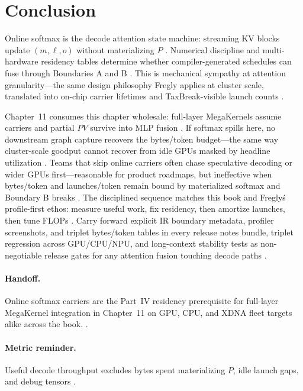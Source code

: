 \section{Conclusion}
\label{sec:ch10_conclusion}

Online softmax is the decode attention state machine: streaming KV blocks update $(m,\ell,o)$ without materializing $P$ \citep{dao2022flashattention,dao2023flashdecoding}. Numerical discipline and multi-hardware residency tables determine whether compiler-generated schedules can fuse through Boundaries A and B \citep{amd2024aie,yirage2026,semianalysis2024tma}. This is mechanical sympathy at attention granularity---the same design philosophy Fregly applies at cluster scale, translated into on-chip carrier lifetimes and TaxBreak-visible launch counts \citep{taxbreak2026,patel2025llminference,liu2024deepseekv3}.

Chapter~11 consumes this chapter wholesale: full-layer MegaKernels assume carriers and partial $PV$ survive into MLP fusion \citep{taxbreak2026,yirage2026}. If softmax spills here, no downstream graph capture recovers the bytes/token budget---the same way cluster-scale goodput cannot recover from idle GPUs masked by headline utilization \citep{memoryfloor2026,nvidia2024cudagraphs}. Teams that skip online carriers often chase speculative decoding or wider GPUs first---reasonable for product roadmaps, but ineffective when bytes/token and launches/token remain bound by materialized softmax and Boundary B breaks \citep{patel2025llminference,taxbreak2026,memoryfloor2026}. The disciplined sequence matches this book and Fregly\'s profile-first ethos: measure useful work, fix residency, then amortize launches, then tune FLOPs \citep{dao2022flashattention,semianalysis2024tma,dlbook}. Carry forward explicit IR boundary metadata, profiler screenshots, and triplet bytes/token tables in every release notes bundle, triplet regression across GPU/CPU/NPU, and long-context stability tests as non-negotiable release gates for any attention fusion touching decode paths \citep{chen2020compilerbasedhardw,kwon2023vllm}.

\paragraph{Handoff.} Online softmax carriers are the Part~IV residency prerequisite for full-layer MegaKernel integration in Chapter~11 on GPU, CPU, and XDNA fleet targets alike across the book. \citep{taxbreak2026,yirage2026,dao2022flashattention,memoryfloor2026,patel2025llminference,chen2020compilerbasedhardw,semianalysis2024tma,amd2024aie,dlbook,kwon2023vllm,nvidia2024cudagraphs,liu2024deepseekv3,dao2023flashdecoding}.



\paragraph{Metric reminder.} Useful decode throughput excludes bytes spent materializing $P$, idle launch gaps, and debug tensors \citep{memoryfloor2026,taxbreak2026,patel2025llminference,dao2022flashattention,yirage2026,chen2020compilerbasedhardw,dlbook,kwon2023vllm,semianalysis2024tma,amd2024aie,nvidia2024cudagraphs,liu2024deepseekv3,dao2023flashdecoding}.
